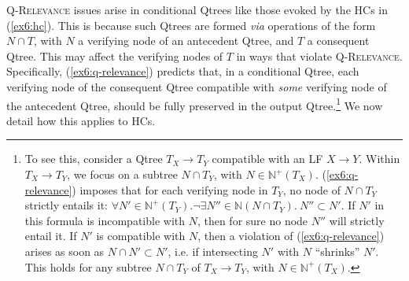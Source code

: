 \textsc{Q-Relevance} issues arise in conditional Qtrees like those evoked by the HCs in (\ref{ex6:hc}). This is because such Qtrees are formed \textit{via} operations of the form $N \cap T$, with $N$ a verifying node of an antecedent Qtree, and $T$ a consequent Qtree. This may affect the verifying nodes of $T$ in ways that violate \textsc{Q-Relevance}. Specifically, (\ref{ex6:q-relevance}) predicts that, in a conditional Qtree, each verifying node of the consequent Qtree compatible with \textit{some} verifying node of the antecedent Qtree, should be fully preserved in the output Qtree.\footnote{To see this, consider a Qtree $T_X\rightarrow T_Y$ compatible with an LF $X \rightarrow Y$. Within $T_X\rightarrow T_Y$, we focus on a subtree $N\cap T_Y$, with $N \in \mathbb{N}^+(T_X)$. (\ref{ex6:q-relevance}) imposes that for each verifying node in $T_Y$, no node of $N\cap T_Y$ strictly entails it: $\forall N' \in \mathbb{N}^+(T_Y). \neg \exists N'' \in \mathbb{N}(N\cap T_Y). \ N'' \subset N'$. If $N'$ in this formula is incompatible with $N$, then for sure no node $N''$ will strictly entail it. If $N'$ is compatible with $N$, then a violation of (\ref{ex6:q-relevance}) arises as soon as $N \cap N' \subset N'$, i.e. if intersecting $N'$ with $N$ ``shrinks'' $N'$. This holds for any subtree $N\cap T_Y$ of $T_X\rightarrow T_Y$, with $N \in \mathbb{N}^+(T_X)$.} We now detail how this applies to HCs.





